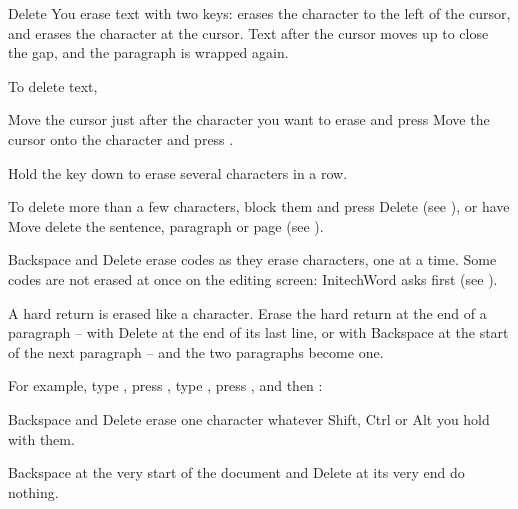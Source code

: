 \begin{Feature}{Delete}
You erase text with two keys:  erases the character to the
left of the cursor, and  erases the character at the cursor.
Text after the cursor moves up to close the gap, and the paragraph is
wrapped again.

To delete text,
\begin{WPSteps}
\item Move the cursor just after the character you want to erase and press
\Or
Move the cursor onto the character and press .
\item Hold the key down to erase several characters in a row.
\end{WPSteps}
\begin{WPNote}To delete more than a few characters, block them and press
Delete (see ), or have Move delete the sentence,
paragraph or page (see ).\end{WPNote}

\Notes
{}
Backspace and Delete erase codes as they erase characters, one at a time.
Some codes are not erased at once on the editing screen: InitechWord asks
first (see ).

A hard return is erased like a character.  Erase the hard return at the end
of a paragraph -- with Delete at the end of its last line, or with
Backspace at the start of the next paragraph -- and the two paragraphs
become one.

For example, type , press , type
, press ,  and then
:
\EndReplay

Backspace and Delete erase one character whatever Shift, Ctrl or Alt you
hold with them.

Backspace at the very start of the document and Delete at its very end do
nothing.

\end{Feature}

